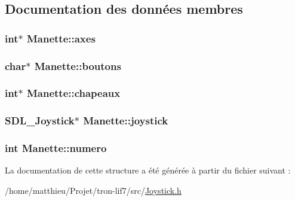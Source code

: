 \subsection{Documentation des données membres}
\hypertarget{structManette_abc9f5234f07d79af9735b501956a8d60}{
\subsubsection[{axes}]{\setlength{\rightskip}{0pt plus 5cm}int$\ast$ Manette\-::axes}}\label{structManette_abc9f5234f07d79af9735b501956a8d60}
\hypertarget{structManette_a07814b5f1ebd865b6e15d2094cf5d671}{
\subsubsection[{boutons}]{\setlength{\rightskip}{0pt plus 5cm}char$\ast$ Manette\-::boutons}}\label{structManette_a07814b5f1ebd865b6e15d2094cf5d671}
\hypertarget{structManette_ab12d322b8fadc5e42218b065e7f86d65}{
\subsubsection[{chapeaux}]{\setlength{\rightskip}{0pt plus 5cm}int$\ast$ Manette\-::chapeaux}}\label{structManette_ab12d322b8fadc5e42218b065e7f86d65}
\hypertarget{structManette_ad11c45cf2d1afa059fae52ab61a177d8}{
\subsubsection[{joystick}]{\setlength{\rightskip}{0pt plus 5cm}S\-D\-L\-\_\-\-Joystick$\ast$ Manette\-::joystick}}\label{structManette_ad11c45cf2d1afa059fae52ab61a177d8}
\hypertarget{structManette_aedc72637b122d8d34ce23f4cf98be10b}{
\subsubsection[{numero}]{\setlength{\rightskip}{0pt plus 5cm}int Manette\-::numero}}\label{structManette_aedc72637b122d8d34ce23f4cf98be10b}


La documentation de cette structure a été générée à partir du fichier suivant \-:\begin{DoxyCompactItemize}
\item 
/home/matthieu/\-Projet/tron-\/lif7/src/\hyperlink{Joystick_8h}{Joystick.\-h}\end{DoxyCompactItemize}
